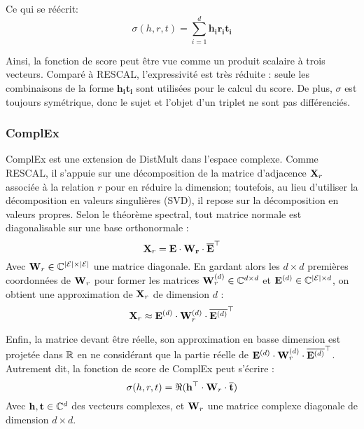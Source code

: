 Ce qui se réécrit:
\begin{equation}
    \sigma(h, r, t) = \sum_{i=1}^{d} \mathbf{h_i r_i t_i}
\end{equation}

Ainsi, la fonction de score peut être vue comme un produit scalaire à trois vecteurs. Comparé à RESCAL, l'expressivité est très réduite : seule les combinaisons de la forme $\mathbf{h_i t_i}$ sont utilisées pour le calcul du score. De plus, $\sigma$ est toujours symétrique, donc le sujet et l'objet d'un triplet ne sont pas différenciés.

\subsubsection{ComplEx}
\label{subsec:complex}

ComplEx est une extension de DistMult dans l'espace complexe. Comme RESCAL, il s'appuie sur une décomposition de la matrice d'adjacence $\bf{X}_r$ associée à la relation $r$ pour en réduire la dimension; toutefois, au lieu d'utiliser la décomposition en valeurs singulières (SVD), il repose sur la décomposition en valeurs propres. Selon le théorème spectral, tout matrice normale est diagonalisable sur une base orthonormale :
\begin{equation}
    \bf{X}_r = \bf{E \cdot W_r \cdot \compconj{E}^\top}
\end{equation}
Avec $\bf{W}_r \in \mathbb{C}^{|\Ent| \times |\Ent|}$ une matrice diagonale. En gardant alors les $d \times d$ premières coordonnées de $\bf{W}_r$ pour former les matrices $\bf{W}_r^{(d)} \in \mathbb{C}^{d \times d}$ et $\bf{E}^{(d)} \in \mathbb{C}^{|\Ent| \times d}$, on obtient une approximation de $\bf{X}_r$ de dimension $d$ :
\begin{equation}
    \bf{X}_r \approx \bf{E}^{(d)} \cdot \bf{W}_r^{(d)} \cdot \compconj{ \bf{E}^{(d)}}^\top
\end{equation}

Enfin, la matrice devant être réelle, son approximation en basse dimension est projetée dans $\R$ en ne considérant que la partie réelle de $\bf{E}^{(d)} \cdot \bf{W}_r^{(d)} \cdot \compconj{ \bf{E}^{(d)}}^\top$. Autrement dit, la fonction de score de ComplEx peut s'écrire :
\begin{equation}
    \sigma(h, r, t) = \Re(\bf{h^\top \cdot W}_r \cdot \compconj{\bf{t}})
\end{equation}
Avec $\bf{h, t} \in \mathbb{C}^d$ des vecteurs complexes, et $\bf{W}_r$ une matrice complexe diagonale de dimension $d \times d$.

